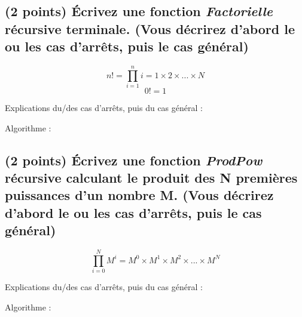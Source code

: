 \documentclass[11pt,a4paper]{article}
\begin{document}
\subsection{(2 points) \'Ecrivez une fonction \og \textit{Factorielle} \fg{} récursive terminale. (Vous décrirez d'abord le ou les cas d'arrêts, puis le cas général) }

\vspace*{-0.5cm}

\begin{center}

\begin{equation*}
n! = \prod^{n}_{i = 1} i = 1 \times 2 \times ... \times N
\end{equation*}
%
\vspace*{-0.5cm}
%
\begin{equation*}
0! = 1
\end{equation*}

Explications du/des cas d'arrêts, puis du cas général :

\bigskip

Algorithme :
\end{center}


\clearpage


\subsection{(2 points) \'Ecrivez une fonction \og \textit{ProdPow} \fg{} récursive calculant le produit des N premières puissances d'un nombre M. (Vous décrirez d'abord le ou les cas d'arrêts, puis le cas général) }

\vspace*{-0.5cm}

\begin{center}

\begin{equation*}
\prod^{N}_{i = 0} M^{i} = M^{0} \times M^{1} \times M^{2} \times ... \times M^{N}
\end{equation*}

Explications du/des cas d'arrêts, puis du cas général :

\bigskip

Algorithme :
\end{center}

\smallskip




%
%
%
%
\end{document}
